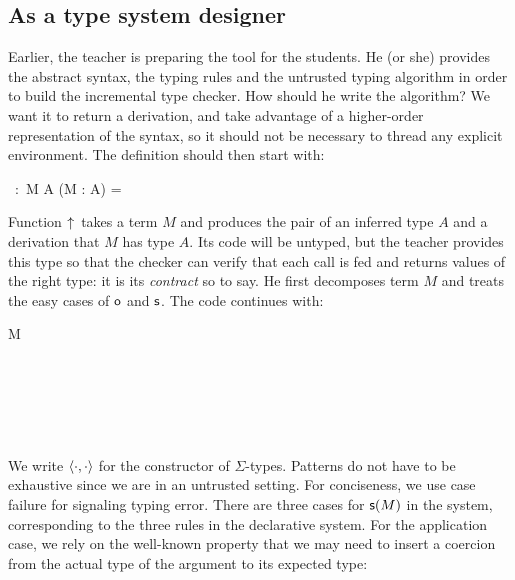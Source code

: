 \documentclass{llncs}
\begin{document}
\subsection{As a type system designer}
\label{sec:lang-incr}

Earlier, the teacher is preparing the tool for the students. He (or
she) provides the abstract syntax, the typing rules and the untrusted
typing algorithm in order to build the incremental type checker. How
should he write the algorithm? We want it to return a derivation, and
take advantage of a higher-order representation of the syntax, so it
should not be necessary to thread any explicit environment. The
definition should then start with:

\begin{mathleft}
  \finfer{}\ :\ \prd M {} \sig A {} (\vdash M : A) =
\end{mathleft}

\noindent
Function $\uparrow\!{}$ takes a term $M$ and produces the pair of an
inferred type $A$ and a derivation that $M$ has type $A$. Its code
will be untyped, but the teacher provides this type so that the
checker can verify that each call is fed and returns values of the
right type: it is its \emph{contract} so to say. He first decomposes
term $M$ and treats the easy cases of $\text{\textsf{o}}$ and $\text{\textsf{s}}$. The
code continues with:

\begin{mathleft}
  \lamd M  \\
  \quad\caseb{\z}  \\
  \quad{}
   \\
  \quad\quad{}
   \\
  \quad\quad{}
   \\
  \quad\quad{}
   \\
\end{mathleft}

\noindent
We write $\langle{\cdot}, {\cdot}\rangle$ for the constructor of $\Sigma$-types.
Patterns do not have to be exhaustive since we are in an untrusted
setting. For conciseness, we use case failure for signaling typing
error. There are three cases for $\text{\textsf{s}} ({M})$ in the system, corresponding
to the three rules in the declarative system. For the application
case, we rely on the well-known property that we may need to insert a
coercion from the actual type of the argument to its expected type:
\end{document}
